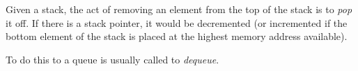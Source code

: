 \documentclass[12pt]{article}
\begin{document}
Given a stack, the act of removing an element from the top of the stack is to \emph{pop} it off. If there is a stack pointer, it would be decremented (or incremented if the bottom element of the stack is placed at the highest memory address available).

To do this to a queue is usually called to \emph{dequeue}.
\end{document}
